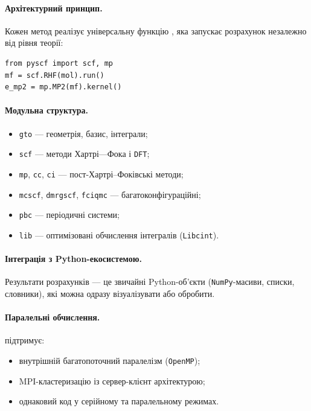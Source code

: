 \paragraph{Архітектурний принцип.}
Кожен метод реалізує універсальну функцію , яка запускає розрахунок незалежно від рівня теорії:

\begin{verbatim}
from pyscf import scf, mp
mf = scf.RHF(mol).run()
e_mp2 = mp.MP2(mf).kernel()
\end{verbatim}

\paragraph{Модульна структура.}
\begin{itemize}
    \item \texttt{gto} --- геометрія, базис, інтеграли;
    \item \texttt{scf} --- методи Хартрі---Фока і \texttt{DFT};
    \item \texttt{mp}, \texttt{cc}, \texttt{ci} --- пост-Хартрі–Фоківські методи;
    \item \texttt{mcscf}, \texttt{dmrgscf}, \texttt{fciqmc} --- багатоконфігураційні;
    \item \texttt{pbc} --- періодичні системи;
    \item \texttt{lib} --- оптимізовані обчислення інтегралів (\texttt{Libcint}).
\end{itemize}

\paragraph{Інтеграція з Python-екосистемою.}
Результати розрахунків --- це звичайні Python-об’єкти (\texttt{NumPy}-масиви, списки, словники), які можна одразу візуалізувати або обробити.

\paragraph{Паралельні обчислення.}
\PySCF{} підтримує:
\begin{itemize}
    \item внутрішній багатопоточний паралелізм (\texttt{OpenMP});
    \item MPI-кластеризацію із сервер-клієнт архітектурою;
    \item однаковий код у серійному та паралельному режимах.
\end{itemize}

